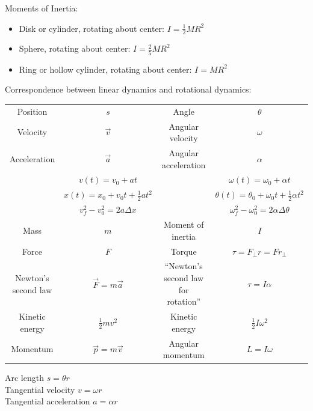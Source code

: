 \documentclass[12pt]{article}
\begin{document}
\begin{enumerate}
Moments of Inertia:
\begin{itemize}
  \item{Disk or cylinder, rotating about center: $I = \frac{1}{2}MR^2$}
  \item{Sphere, rotating about center: $I = \frac{2}{5}MR^2$}
  \item{Ring or hollow cylinder, rotating about center: $I = MR^2$}
\end{itemize}

\bigskip
\bigskip
\bigskip

Correspondence between linear dynamics and rotational dynamics: 
  \scriptsize

\begin{tabular}{| c | c | c | c |}
  \hline
  Position & $s$ & Angle & $\theta$  \\
  Velocity & $\vec v$ & Angular velocity & $\omega$  \\
  Acceleration & $\vec a$ & Angular acceleration & $\alpha$  \\
  \hline
                                   & $v(t) = v_0 + at$ & & $\omega(t) = \omega_0 + \alpha t$ \\
                                   & $x(t) = x_0 + v_0 t + \frac{1}{2} at^2$ & & $\theta(t) = \theta_0 + \omega_0 t + \frac{1}{2} \alpha t^2$ \\
                                   & $v_f^2 - v_0^2 = 2a \Delta x$ & & $\omega_f^2 - \omega_0^2 = 2 \alpha \Delta \theta$ \\
  \hline
  Mass & $m$ & Moment of inertia & $I$ \\
  \hline
  Force & $F$ & Torque & $\tau = F_\perp r = F r_\perp$ \\
  \hline
  Newton's second law & $\vec F = m \vec a$ & ``Newton's second law for rotation'' & $\tau = I \alpha$ \\
  \hline
  Kinetic energy & $\frac{1}{2} mv^2$ & Kinetic energy & $\frac{1}{2}I\omega^2$ \\
  \hline
  Momentum & $\vec p = m \vec v$ & Angular momentum & $L = I \omega$ \\
  \hline
\end{tabular}

\bigskip
\bigskip
\bigskip

Arc length $s=\theta r$ \\
Tangential velocity $v=\omega r$ \\
Tangential acceleration $a=\alpha r$




 \end{enumerate}
 
\end{document}
